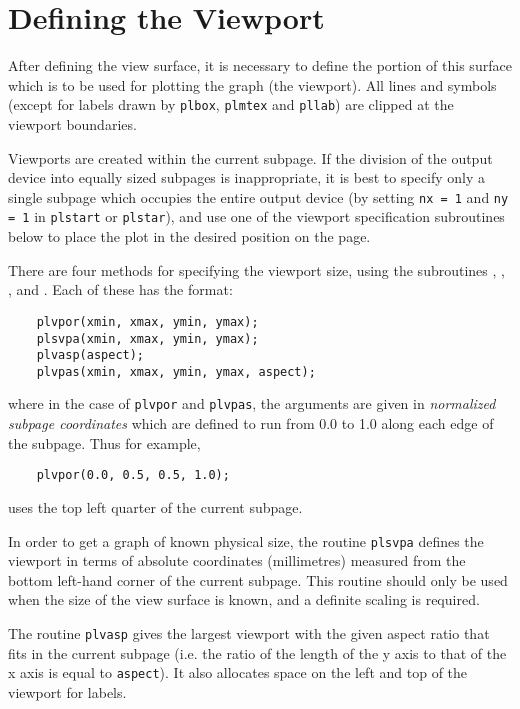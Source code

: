 
\section {Defining the Viewport} \label{viewport}

After defining the view surface, it is necessary to define the portion of
this surface which is to be used for plotting the graph (the viewport). All
lines and symbols (except for labels drawn by {\tt plbox}, {\tt plmtex} and
{\tt pllab}) are clipped at the viewport boundaries. 

Viewports are created within the current subpage. If the division of the
output device into equally sized subpages is inappropriate, it is best
to specify only a single subpage which occupies the entire output device
(by setting {\tt nx = 1} and {\tt ny = 1} in {\tt plstart} or {\tt plstar}), 
and use one of the viewport specification subroutines below to place the
plot in the desired position on the page.

There are four methods for specifying the viewport size, using the
subroutines , , , and .
Each of these has the format:
\begin{verbatim}
    plvpor(xmin, xmax, ymin, ymax);
    plsvpa(xmin, xmax, ymin, ymax);
    plvasp(aspect);
    plvpas(xmin, xmax, ymin, ymax, aspect);
\end{verbatim}
where in the case of {\tt plvpor} and {\tt plvpas}, the arguments are given
in {\em normalized subpage coordinates\/} which are defined to run from 0.0
to 1.0 along each edge of the subpage. Thus for example,
\begin{verbatim}
    plvpor(0.0, 0.5, 0.5, 1.0);
\end{verbatim}
uses the top left quarter of the current subpage.

In order to get a graph of known physical size, the routine {\tt plsvpa}
defines the viewport in terms of absolute coordinates (millimetres) measured
from the bottom left-hand corner of the current subpage.  This routine
should only be used when the size of the view surface is known, and a
definite scaling is required.  

The routine {\tt plvasp} gives the largest viewport with the given aspect
ratio that fits in the current subpage (i.e. the ratio of the length of the
y axis to that of the x axis is equal to {\tt aspect}).  It also allocates
space on the left and top of the viewport for labels. 

